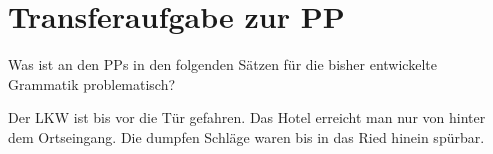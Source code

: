 \section{Transferaufgabe zur PP}

Was ist an den PPs in den folgenden Sätzen für die bisher entwickelte Grammatik problematisch?

\begin{exe}
  \ex Der LKW ist bis vor die Tür gefahren.
  \ex Das Hotel erreicht man nur von hinter dem Ortseingang.
  \ex Die dumpfen Schläge waren bis in das Ried hinein spürbar.
\end{exe}

\newpage
\hspace{1em}
\newpage
\hspace{1em}

